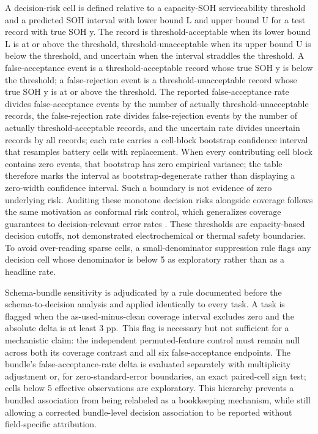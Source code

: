 \documentclass[
  number,
  preprint]{elsarticle}
\begin{document}
A decision-risk cell is defined relative to a capacity-SOH
serviceability threshold and a predicted SOH interval with lower bound L
and upper bound U for a test record with true SOH y. The record is
threshold-acceptable when its lower bound L is at or above the
threshold, threshold-unacceptable when its upper bound U is below the
threshold, and uncertain when the interval straddles the threshold. A
false-acceptance event is a threshold-acceptable record whose true SOH y
is below the threshold; a false-rejection event is a
threshold-unacceptable record whose true SOH y is at or above the
threshold. The reported false-acceptance rate divides false-acceptance
events by the number of actually threshold-unacceptable records, the
false-rejection rate divides false-rejection events by the number of
actually threshold-acceptable records, and the uncertain rate divides
uncertain records by all records; each rate carries a cell-block
bootstrap confidence interval that resamples battery cells with
replacement. When every contributing cell block contains zero events,
that bootstrap has zero empirical variance; the table therefore marks
the interval as bootstrap-degenerate rather than displaying a zero-width
confidence interval. Such a boundary is not evidence of zero underlying
risk. Auditing these monotone decision risks alongside coverage follows
the same motivation as conformal risk control, which generalizes
coverage guarantees to decision-relevant error rates
\citep{angelopoulos2024conformalrisk}. These thresholds are
capacity-based decision cutoffs, not demonstrated electrochemical or
thermal safety boundaries. To avoid over-reading sparse cells, a
small-denominator suppression rule flags any decision cell whose
denominator is below 5 as exploratory rather than as a headline rate.

Schema-bundle sensitivity is adjudicated by a rule documented before the
schema-to-decision analysis and applied identically to every task. A
task is flagged when the as-used-minus-clean coverage interval excludes
zero and the absolute delta is at least 3 pp.~This flag is necessary but
not sufficient for a mechanistic claim: the independent permuted-feature
control must remain null across both its coverage contrast and all six
false-acceptance endpoints. The bundle's false-acceptance-rate delta is
evaluated separately with multiplicity adjustment or, for
zero-standard-error boundaries, an exact paired-cell sign test; cells
below 5 effective observations are exploratory. This hierarchy prevents
a bundled association from being relabeled as a bookkeeping mechanism,
while still allowing a corrected bundle-level decision association to be
reported without field-specific attribution.
\end{document}
